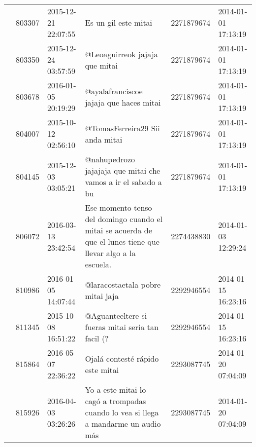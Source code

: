 \begin{tabular}{llllrl}
           & 803307  & 2015-12-21 22:07:55 &                                                                                                                         Es un gil este mitai &  2271879674 & 2014-01-01 17:13:19 \\
           & 803350  & 2015-12-24 03:57:59 &                                                                                                               @Leoaguirreok jajaja que mitai &  2271879674 & 2014-01-01 17:13:19 \\
           & 803678  & 2016-01-05 20:19:29 &                                                                                                      @ayalafranciscoe jajaja que haces mitai &  2271879674 & 2014-01-01 17:13:19 \\
           & 804007  & 2015-10-12 02:56:10 &                                                                                                              @TomasFerreira29 Sii anda mitai &  2271879674 & 2014-01-01 17:13:19 \\
           & 804145  & 2015-12-03 03:05:21 &                                                                               @nahupedrozo jajajaja que mitai  che vamos a ir el sabado a bu &  2271879674 & 2014-01-01 17:13:19 \\
           & 806072  & 2016-03-13 23:42:54 &                                 Ese momento tenso del domingo cuando el mitai se acuerda de que el lunes tiene que llevar algo a la escuela. &  2274438830 & 2014-01-03 12:29:24 \\
           & 810986  & 2016-01-05 14:07:44 &                                                                                                             @laracostaetala pobre mitai jaja &  2292946554 & 2014-01-15 16:23:16 \\
           & 811345  & 2015-10-08 16:51:22 &                                                                                            @Aguanteeltere si fueras mitai seria tan facil (? &  2292946554 & 2014-01-15 16:23:16 \\
           & 815864  & 2016-05-07 22:36:22 &                                                                                                             Ojalá contesté rápido este mitai &  2293087745 & 2014-01-20 07:04:09 \\
           & 815926  & 2016-04-03 03:26:26 &                                                           Yo a este mitai lo cagó a trompadas cuando lo vea si llega a mandarme un audio más &  2293087745 & 2014-01-20 07:04:09 \\

\end{tabular}
